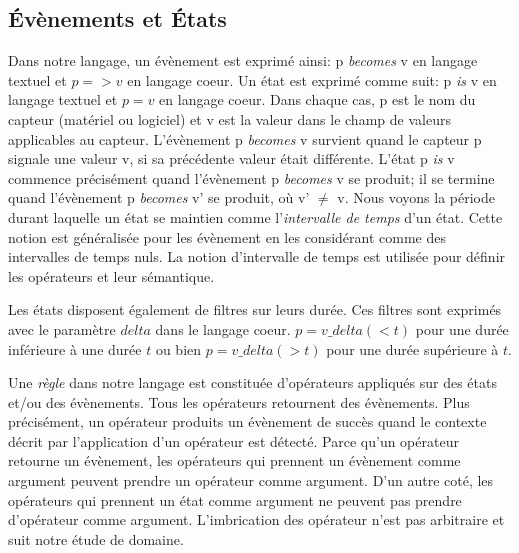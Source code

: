 \subsection{Évènements et États}
Dans notre langage, un évènement est exprimé ainsi: {\ttfamily p {\em becomes} v} en langage textuel et  $p=>v$ en langage coeur. Un état est exprimé comme suit: {\ttfamily p {\em is} v} en langage textuel et $p=v$ en langage coeur. Dans chaque cas, {\ttfamily p} est le nom du capteur (matériel ou logiciel) et {\ttfamily v} est la valeur dans le champ de valeurs applicables au capteur. L'évènement {\ttfamily p {\em becomes} v} survient quand le capteur {\ttfamily p} signale une valeur {\ttfamily v}, si sa précédente valeur était différente. L'état {\ttfamily p {\em is} v} commence précisément quand l'évènement {\ttfamily p {\em becomes} v} se produit; il se termine quand l'évènement {\ttfamily p {\em becomes} v'} se produit, où {\ttfamily v'} $\neq$ {\ttfamily v}. Nous voyons la période durant laquelle un état se maintien comme l'{\em intervalle de temps} d'un état. Cette notion est généralisée pour les évènement en les considérant comme des intervalles de temps nuls. La notion d'intervalle de temps est utilisée pour définir les opérateurs et leur sémantique.

Les états disposent également de filtres sur leurs durée. Ces filtres sont exprimés avec le paramètre $delta$ dans le langage coeur. $p=v\_delta(<t)$ pour une durée inférieure à une durée $t$ ou bien $p=v\_delta(>t)$ pour une durée supérieure à $t$.

Une {\em règle} dans notre langage est constituée d'opérateurs appliqués sur des états et/ou des évènements. Tous les opérateurs retournent des évènements.
Plus précisément, un opérateur produits un évènement de succès quand le contexte décrit par l'application d'un opérateur est détecté.
Parce qu'un opérateur retourne un évènement, les opérateurs qui prennent un évènement comme argument peuvent prendre un opérateur comme argument.
D'un autre coté, les opérateurs qui prennent un état comme argument ne peuvent pas prendre d'opérateur comme argument.
L'imbrication des opérateur n'est pas arbitraire et suit notre étude de domaine.


